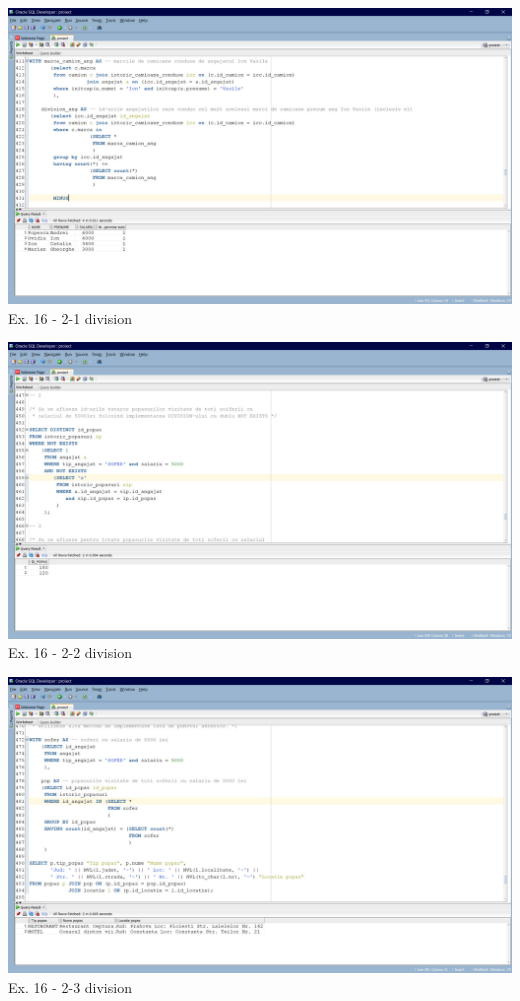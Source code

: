 \documentclass[12pt, a4paper]{article}
\begin{document}
\includegraphics[width=\textwidth]{division_1.png}
\label{Ex16 2-1}
\centering Ex. 16 - 2-1 division

\includegraphics[width=\textwidth]{division_2.png}
\label{Ex16 2-2}
\centering Ex. 16 - 2-2 division

\includegraphics[width=\textwidth]{division_3.png}
\label{Ex16 2-3}
\centering Ex. 16 - 2-3 division
\end{document}
